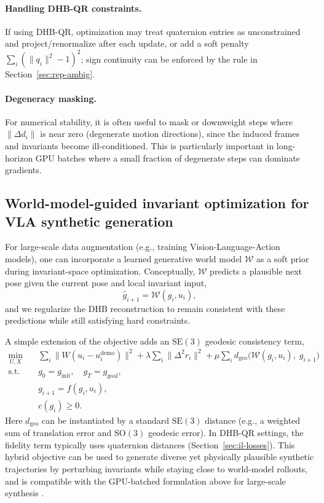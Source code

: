 \documentclass[11pt]{article}
\begin{document}
\paragraph{Handling DHB-QR constraints.}
If using DHB-QR, optimization may treat quaternion entries as unconstrained and project/renormalize after each update, or add a soft penalty $\sum_i (\lVert q_i\rVert^2-1)^2$; sign continuity can be enforced by the rule in Section~\ref{sec:rep-ambig}.

\paragraph{Degeneracy masking.}
For numerical stability, it is often useful to mask or downweight steps where $\lVert \Delta d_i\rVert$ is near zero (degenerate motion directions), since the induced frames and invariants become ill-conditioned. This is particularly important in long-horizon GPU batches where a small fraction of degenerate steps can dominate gradients.

\subsection{World-model-guided invariant optimization for VLA synthetic generation}
For large-scale data augmentation (e.g., training Vision-Language-Action models), one can incorporate a learned generative world model $\mathcal{W}$ as a soft prior during invariant-space optimization. Conceptually, $\mathcal{W}$ predicts a plausible next pose given the current pose and local invariant input,
\begin{equation}
  \hat g_{i+1} = \mathcal{W}(g_i, u_i),
\end{equation}
and we regularize the DHB reconstruction to remain consistent with these predictions while still satisfying hard constraints.

A simple extension of the objective adds an $\mathrm{SE}(3)$ geodesic consistency term,
\begin{align}
  \min_{U,X}\quad & \sum_i \lVert W (u_i - u_i^{\mathrm{demo}})\rVert^2
  + \lambda \sum_i \lVert \Delta^2 r_i\rVert^2
  + \mu \sum_i d_{\mathrm{geo}}\bigl( \mathcal{W}(g_i,u_i),\; g_{i+1} \bigr) \\
  \text{s.t.}\quad & g_0 = g_{\mathrm{init}},\quad g_T = g_{\mathrm{goal}}, \\
  & g_{i+1} = f(g_i, u_i), \\
  & c(g_i) \ge 0.
\end{align}
Here $d_{\mathrm{geo}}$ can be instantiated by a standard $\mathrm{SE}(3)$ distance (e.g., a weighted sum of translation error and $\mathrm{SO}(3)$ geodesic error). In DHB-QR settings, the fidelity term typically uses quaternion distances (Section~\ref{sec:il-losses}). This hybrid objective can be used to generate diverse yet physically plausible synthetic trajectories by perturbing invariants while staying close to world-model rollouts, and is compatible with the GPU-batched formulation above for large-scale synthesis \cite{wu2025ctrlworld,gigaworld2025,gigabrain2025,he2025beyondhuman,li2025vlasurvey}.
\end{document}
